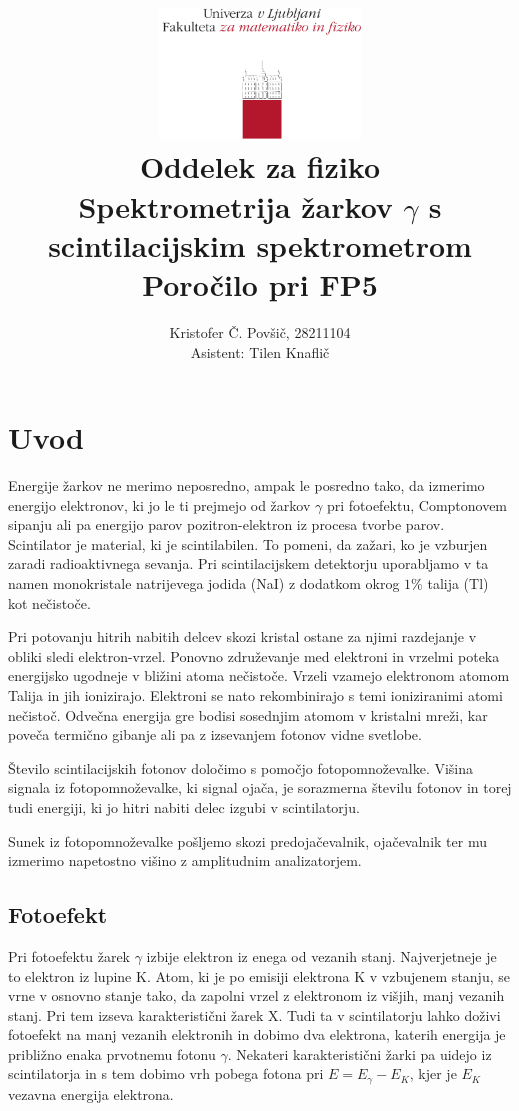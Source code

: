 \documentclass[11pt]{article}
\title{
  \includegraphics[width=0.4\textwidth]{fmf_logo}\\
  {\small Oddelek za fiziko} \\
  {Spektrometrija žarkov \(  \gamma \) s scintilacijskim spektrometrom}\\
  {\small Poročilo pri FP5}\\

}
\date{}
\author{ Kristofer Č. Povšič, 28211104 \\[5 cm]
 \small  Asistent: Tilen Knaflič \\
}
\begin{document}
\maketitle
\tableofcontents

\section{Uvod}\label{sec:orge7c61fa}

Energije žarkov ne merimo neposredno, ampak le posredno tako, da izmerimo energijo elektronov, ki jo le ti prejmejo od žarkov \(\gamma\) pri fotoefektu, Comptonovem sipanju ali pa energijo parov pozitron-elektron iz procesa tvorbe parov. Scintilator
je material, ki je scintilabilen. To pomeni, da zažari, ko je vzburjen zaradi
radioaktivnega sevanja. Pri scintilacijskem detektorju uporabljamo v ta namen monokristale natrijevega jodida (NaI) z dodatkom okrog \(1 \%\) talija (Tl) kot nečistoče.

Pri potovanju hitrih nabitih delcev skozi kristal ostane za njimi razdejanje v obliki sledi elektron-vrzel. Ponovno združevanje med elektroni in vrzelmi poteka energijsko ugodneje v bližini atoma nečistoče. Vrzeli vzamejo elektronom atomom Talija in jih ionizirajo. Elektroni se nato rekombinirajo s temi ioniziranimi atomi nečistoč. Odvečna energija gre bodisi sosednjim atomom v kristalni mreži, kar poveča termično gibanje ali pa z izsevanjem fotonov vidne svetlobe.

Število scintilacijskih fotonov določimo s pomočjo fotopomnoževalke. Višina signala iz fotopomnoževalke, ki signal ojača, je sorazmerna številu fotonov in torej tudi energiji, ki jo hitri nabiti delec izgubi v scintilatorju.

Sunek iz fotopomnoževalke pošljemo skozi predojačevalnik, ojačevalnik ter mu izmerimo napetostno višino z amplitudnim analizatorjem.
\subsection{Fotoefekt}\label{sec:orgf12cecc}

Pri fotoefektu žarek \(\gamma\) izbije elektron iz enega od vezanih stanj. Najverjetneje je to elektron iz lupine K. Atom, ki je po emisiji elektrona K v vzbujenem stanju, se vrne v osnovno stanje tako, da zapolni vrzel z elektronom iz višjih, manj vezanih stanj.
Pri tem izseva karakteristični žarek X. Tudi ta v scintilatorju lahko doživi
fotoefekt na manj vezanih elektronih in dobimo dva elektrona, katerih
energija je približno enaka prvotnemu fotonu \(\gamma\). Nekateri
karakteristični žarki pa uidejo iz
scintilatorja in s tem dobimo vrh pobega fotona pri \(E = E_{\gamma} - E_K\),
kjer je \(E_K\) vezavna energija elektrona.
\end{document}
